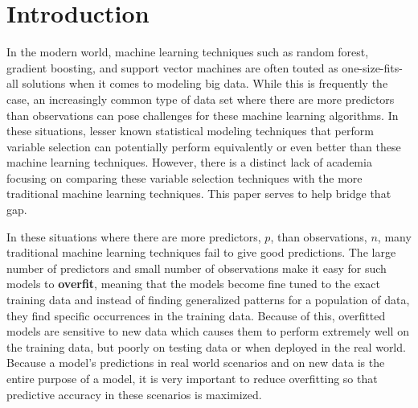 \documentclass{article}
\begin{document}
\newpage
\tableofcontents
\newpage

\section{Introduction}

In the modern world, machine learning techniques such as random forest, gradient boosting, and support vector machines are often touted as one-size-fits-all solutions when it comes to modeling big data. While this is frequently the case, an increasingly common type of data set where there are more predictors than observations can pose challenges for these machine learning algorithms. In these situations, lesser known statistical modeling techniques that perform variable selection can potentially perform equivalently or even better than these machine learning techniques. However, there is a distinct lack of academia focusing on comparing these variable selection techniques with the more traditional machine learning techniques. This paper serves to help bridge that gap.



In these situations where there are more predictors, $p$, than observations, $n$, many traditional machine learning techniques fail to give good predictions. The large number of predictors and small number of observations make it easy for such models to \textbf{overfit}, meaning that the models become fine tuned to the exact training data and instead of finding generalized patterns for a population of data, they find specific occurrences in the training data. Because of this, overfitted models are sensitive to new data which causes them to perform extremely well on the training data, but poorly on testing data or when deployed in the real world. Because a model's predictions in real world scenarios and on new data is the entire purpose of a model, it is very important to reduce overfitting so that predictive accuracy in these scenarios is maximized.
\end{document}
